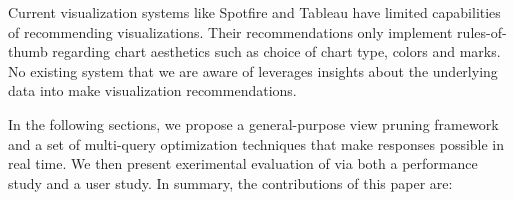 





Current visualization systems like Spotfire and Tableau have limited capabilities of 
recommending visualizations.
Their recommendations only implement rules-of-thumb regarding chart aesthetics such as choice of
chart type, colors and marks.
No existing system that we are aware of leverages insights about the underlying data
into make visualization recommendations.  

In the following sections, we propose a general-purpose view pruning framework and a set
of multi-query optimization techniques that make responses possible in real time.
We then present exerimental evaluation of \SeeDB via both a performance study and a user study.
In summary, the contributions of this paper are:


